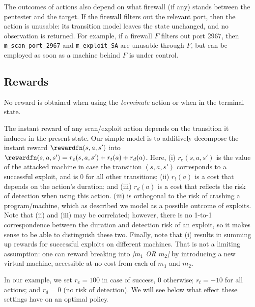 The outcomes of actions also depend on what firewall (if any) stands
between the pentester and the target. If the firewall filters out the
relevant port, then the action is unusable: its transition model
leaves the state unchanged, and no observation is returned. For
example, if a firewall $F$ filters out port 2967, then {\scriptsize
  \verb+m_scan_port_2967+} and {\scriptsize \verb+m_exploit_SA+} are
unusable through $F$, but can be employed as soon as a machine behind
$F$ is under control.




\subsection{Rewards}
\label{POMDP-model:rewards}

No reward is obtained when using the \emph{terminate} action or when
in the terminal state. 

The instant reward of any scan/exploit action depends on the
transition it induces in the present state. Our simple model is to
additively decompose the instant reward $\rewardfn(s,a,s')$ into
$\rewardfn(s,a,s') = r_e(s,a,s') + r_t(a) + r_d(a)$.  Here, (i)
$r_e(s,a,s')$ is the value of the attacked machine in case the
transition $(s,a,s')$ corresponds to a successful exploit, and is $0$
for all other transitions; (ii) $r_t(a)$ is a cost that depends on the
action's duration; %
and (iii) $r_d(a)$ is a cost that reflects the risk of detection when
using this action. (iii) is orthogonal to the risk of crashing a
program/machine, which as described we model as a possible outcome of
exploits. Note that (ii) and (iii) may be correlated; however, there
is no 1-to-1 correspondence between the duration and detection risk of
an exploit, so it makes sense to be able to distinguish these
two. Finally, note that (i) results in summing up rewards for
successful exploits on different machines. That is not a limiting
assumption: one can reward breaking into \emph{[$m_1$ OR $m_2$]} by
introducing a new virtual machine, accessible at no cost from each of
$m_1$ and $m_2$.


\vspace{-0.05cm}
\begin{example}\label{exp:running-rewards}
In our example, we set $r_e=100$ in case of success, $0$ otherwise;
$r_t=-10$ for all actions; and $r_d=0$ (no risk of detection). We will
see below what effect these settings have on an optimal policy.
\end{example}
\vspace{-0.05cm}


